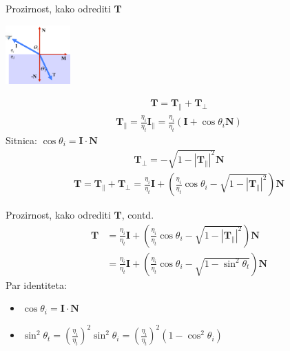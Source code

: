\documentclass[9pt]{beamer}
\begin{document}
\begin{frame}{Prozirnost, kako odrediti $\mathbf{T}$}
\begin{center}
\includegraphics[width=2.5cm]{slike/prozirnost_02.png}
\end{center}
\begin{align*}
\mathbf{T} = \mathbf{T}_\parallel + \mathbf{T}_\perp
\end{align*}
\begin{align*}
\mathbf{T}_\parallel = \frac{\eta_i}{\eta_t}\mathbf{I}_\parallel = \frac{\eta_i}{\eta_t}(\mathbf{I} + \cos \theta_i \mathbf{N})
\end{align*}
Sitnica: $ \cos \theta_i = \mathbf{I} \cdot \mathbf{N}$
\begin{align*}
\mathbf{T}_\perp = -\sqrt{1- |\mathbf{T}_\parallel|^2}\mathbf{N}
\end{align*}
\begin{align*}
\mathbf{T} = \mathbf{T}_\parallel + \mathbf{T}_\perp = \frac{\eta_i}{\eta_t}\mathbf{I} + \left(\frac{\eta_i}{\eta_t} \cos \theta_i - \sqrt{1- |\mathbf{T}_\parallel|^2}\right)\mathbf{N}
\end{align*}
\end{frame}

\begin{frame}{Prozirnost, kako odrediti $\mathbf{T}$, contd.}
	\begin{align*}
	\mathbf{T} & = \frac{\eta_i}{\eta_t}\mathbf{I} + \left(\frac{\eta_i}{\eta_t} \cos \theta_i - \sqrt{1- |\mathbf{T}_\parallel|^2}\right)\mathbf{N} \\
	  & = \frac{\eta_i}{\eta_t}\mathbf{I} + \left(\frac{\eta_i}{\eta_t} \cos \theta_i - \sqrt{1- \sin^2 \theta_t}\right)\mathbf{N}
	\end{align*}
	Par identiteta:
	\begin{itemize}
		\item $ \cos \theta_i = \mathbf{I} \cdot \mathbf{N}$
		\item $\sin^2 \theta_t = (\frac{\eta_i}{\eta_t})^2\sin^2 \theta_i = (\frac{\eta_i}{\eta_t})^2(1-\cos^2 \theta_i)$
	\end{itemize}
\end{frame}
\end{document}
